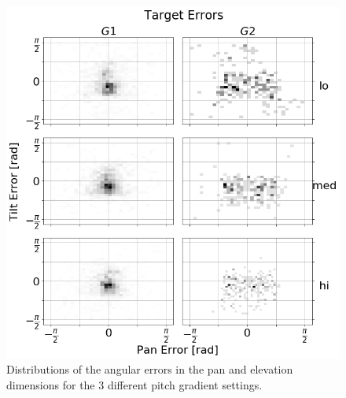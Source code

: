 \documentclass[]{interact}
\begin{document}
\begin{figure}
  \centering
  \includegraphics[width=1.0\textwidth]{figures/target_errors.png}
  \caption{Distributions of the angular errors in the pan and elevation dimensions for the 3 different pitch gradient settings. }\label{fig:target-errors}
\end{figure}
\end{document}

